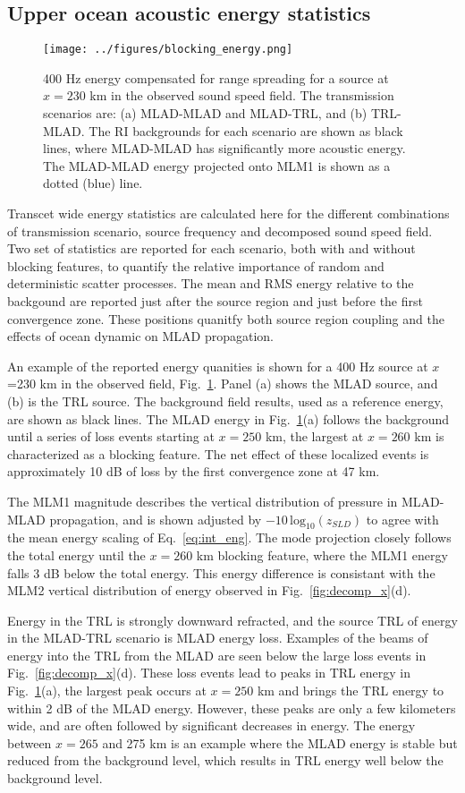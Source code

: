 \documentclass[preprint,NumberedRefs]{JASA}
\begin{document}
\subsection{Upper ocean acoustic energy statistics}\label{ssec:energy}
\begin{figure}
\texttt{[image: ../figures/blocking\_energy.png]}
    \caption{400 Hz energy compensated for range spreading for a source at $x=230$ km in the observed sound speed field. The transmission scenarios are: (a) MLAD-MLAD and MLAD-TRL, and (b) TRL-MLAD. The RI backgrounds for each scenario are shown as black lines, where MLAD-MLAD has significantly more acoustic energy. The MLAD-MLAD energy projected onto MLM1 is shown as a dotted (blue) line.}
    \label{fig:ml_energy}
\end{figure}
Transcet wide energy statistics are calculated here for the different combinations of transmission scenario, source frequency and decomposed sound speed field. Two set of statistics are reported for each scenario, both with and without blocking features, to quantify the relative importance of random and deterministic scatter processes. The mean and RMS energy relative to the backgound are reported just after the source region and just before the first convergence zone. These positions quanitfy both source region coupling and the effects of ocean dynamic on MLAD propagation.

An example of the reported energy quanities is shown for a 400 Hz source at $x$=230 km in the observed field, Fig.~\ref{fig:ml_energy}. Panel (a) shows the MLAD source, and (b) is the TRL source. The background field results, used as a reference energy, are shown as black lines. The MLAD energy in Fig.~\ref{fig:ml_energy}(a) follows the background until a series of loss events starting at $x=250$ km, the largest at $x=260$ km is characterized as a blocking feature. The net effect of these localized events is approximately 10 dB of loss by the first convergence zone at 47 km.

The MLM1 magnitude describes the vertical distribution of pressure in MLAD-MLAD propagation, and is shown adjusted by $-10 \, \textrm{log}_{10}(z_{SLD})$ to agree with the mean energy scaling of Eq.~\eqref{eq:int_eng}. The mode projection closely follows the total energy until the $x=260$ km blocking feature, where the MLM1 energy falls 3 dB below the total energy. This energy difference is consistant with the MLM2 vertical distribution of energy observed in Fig.~\ref{fig:decomp_x}(d).

Energy in the TRL is strongly downward refracted, and the source TRL of energy in the MLAD-TRL scenario is MLAD energy loss. Examples of the beams of energy into the TRL from the MLAD are seen below the large loss events in Fig.~\ref{fig:decomp_x}(d). These loss events lead to peaks in TRL energy in Fig.~\ref{fig:ml_energy}(a), the largest peak occurs at $x=250$ km and brings the TRL energy to within 2 dB of the MLAD energy. However, these peaks are only a few kilometers wide, and are often followed by significant decreases in energy. The energy between $x=265$ and 275 km is an example where the MLAD energy is stable but reduced from the background level, which results in TRL energy well below the background level.
\end{document}
